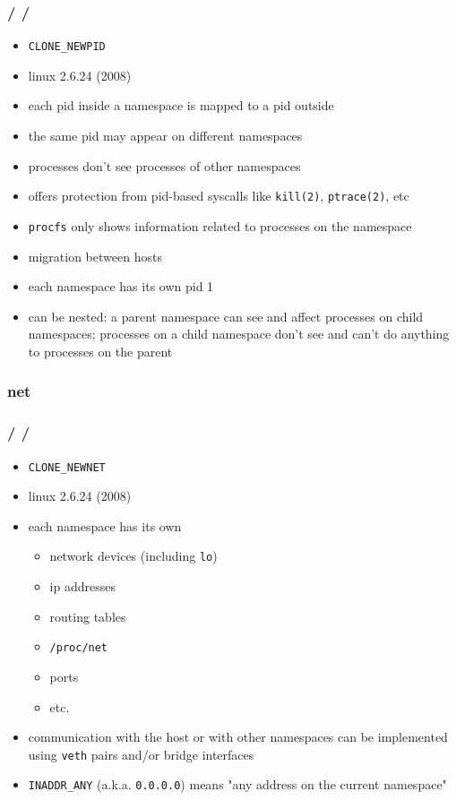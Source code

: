 \documentclass{beamer}
\newcommand{\autotitle}
{\frametitle{
    \secname
    \ifx\insertsubsection\empty
    \else
        /\subsecname
        \ifx\insertsubsubsection\empty\else/\subsubsecname\fi
    \fi}}
\begin{document}
\begin{frame}
    \autotitle
    \begin{itemize}
        \item \texttt{CLONE\_NEWPID}
        \item linux 2.6.24 (2008)
        \item each pid inside a namespace is mapped to a pid outside
        \item the same pid may appear on different namespaces
        \item processes don't see processes of other namespaces
        \item
            offers protection from pid-based syscalls like \texttt{kill(2)},
            \texttt{ptrace(2)}, etc
        \item
            \texttt{procfs} only shows information related to processes on the
            namespace
        \item migration between hosts
        \item each namespace has its own pid 1
        \item
            can be nested: a parent namespace can see and affect processes on
            child namespaces; processes on a child namespace don't see and
            can't do anything to processes on the parent
    \end{itemize}
\end{frame}

\subsubsection{net}

\begin{frame}
    \autotitle
    \begin{itemize}
        \item \texttt{CLONE\_NEWNET}
        \item linux 2.6.24 (2008)
        \item each namespace has its own
            \begin{itemize}
                \item network devices (including \texttt{lo})
                \item ip addresses
                \item routing tables
                \item \texttt{/proc/net}
                \item ports
                \item etc.
            \end{itemize}
        \item
            communication with the host or with other namespaces can be
            implemented using \texttt{veth} pairs and/or bridge interfaces
        \item
            \texttt{INADDR\_ANY} (a.k.a. \texttt{0.0.0.0}) means "any address
            on the current namespace"
    \end{itemize}
\end{frame}
\end{document}
